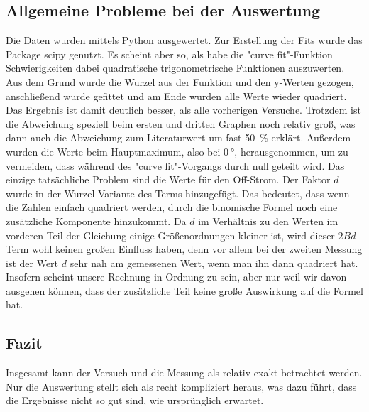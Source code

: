 \subsection{Allgemeine Probleme bei der Auswertung}
Die Daten wurden mittels Python ausgewertet. Zur Erstellung der Fits wurde das Package scipy \cite{scipy} genutzt. Es scheint aber so, als habe die "curve fit"-Funktion Schwierigkeiten dabei quadratische trigonometrische Funktionen auszuwerten. Aus dem Grund wurde die Wurzel aus der Funktion und den y-Werten gezogen, anschließend wurde gefittet und am Ende wurden alle Werte wieder quadriert. Das Ergebnis ist damit deutlich besser, als alle vorherigen Versuche. Trotzdem ist die Abweichung speziell beim ersten und dritten Graphen noch relativ groß, was dann auch die Abweichung zum Literaturwert um fast \SI{50}{\percent} erklärt. 
Außerdem wurden die Werte beim Hauptmaximum, also bei $\SI{0}{\degree}$, herausgenommen, um zu vermeiden, dass während des "curve fit"-Vorgangs durch null geteilt wird. 
Das einzige tatsächliche Problem sind die Werte für den Off-Strom. Der Faktor $d$ wurde in der Wurzel-Variante des Terms hinzugefügt. Das bedeutet, dass wenn die Zahlen einfach quadriert werden, durch die binomische Formel noch eine zusätzliche Komponente hinzukommt. Da $d$ im Verhältnis zu den Werten im vorderen Teil der Gleichung einige Größenordnungen kleiner ist, wird dieser $2 B d$-Term wohl keinen großen Einfluss haben, denn vor allem bei der zweiten Messung ist der Wert $d$ sehr nah am gemessenen Wert, wenn man ihn dann quadriert hat. Insofern scheint unsere Rechnung in Ordnung zu sein, aber nur weil wir davon ausgehen können, dass der zusätzliche Teil keine große Auswirkung auf die Formel hat. 

\subsection{Fazit} 
Insgesamt kann der Versuch und die Messung als relativ exakt betrachtet werden. Nur die Auswertung stellt sich als recht kompliziert heraus, was dazu führt, dass die Ergebnisse nicht so gut sind, wie ursprünglich erwartet.  

\newpage
